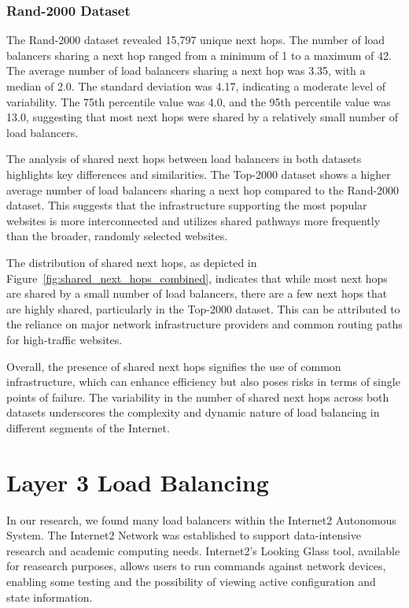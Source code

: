 \documentclass[12pt]{cwru_thesis}
\begin{document}
\subsection{Rand-2000 Dataset}

The Rand-2000 dataset revealed 15,797 unique next hops. The number of load balancers sharing a next hop ranged from a minimum of 1 to a maximum of 42. The average number of load balancers sharing a next hop was 3.35, with a median of 2.0. The standard deviation was 4.17, indicating a moderate level of variability. The 75th percentile value was 4.0, and the 95th percentile value was 13.0, suggesting that most next hops were shared by a relatively small number of load balancers.

The analysis of shared next hops between load balancers in both datasets highlights key differences and similarities. The Top-2000 dataset shows a higher average number of load balancers sharing a next hop compared to the Rand-2000 dataset. This suggests that the infrastructure supporting the most popular websites is more interconnected and utilizes shared pathways more frequently than the broader, randomly selected websites.

The distribution of shared next hops, as depicted in Figure~\ref{fig:shared_next_hops_combined}, indicates that while most next hops are shared by a small number of load balancers, there are a few next hops that are highly shared, particularly in the Top-2000 dataset. This can be attributed to the reliance on major network infrastructure providers and common routing paths for high-traffic websites.

Overall, the presence of shared next hops signifies the use of common infrastructure, which can enhance efficiency but also poses risks in terms of single points of failure. The variability in the number of shared next hops across both datasets underscores the complexity and dynamic nature of load balancing in different segments of the Internet.


\chapter{Layer 3 Load Balancing}
In our research, we found many load balancers within the Internet2 Autonomous System. The Internet2 Network was established to support data-intensive research and academic computing needs. Internet2's Looking Glass tool, available for reasearch purposes, allows users to run commands against network devices, enabling some testing and the possibility of viewing active configuration and state information.
\end{document}
